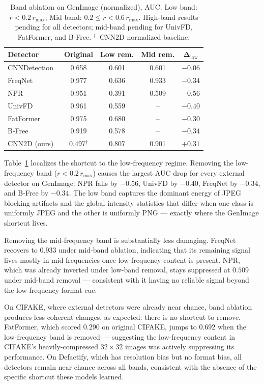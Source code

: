 \begin{table}[t]
\centering
\small
\setlength{\tabcolsep}{5pt}
\begin{tabular}{lcccc}
\toprule
\textbf{Detector} & \textbf{Original} & \textbf{Low rem.} & \textbf{Mid rem.} & $\boldsymbol{\Delta}_\text{low}$ \\
\midrule
CNNDetection~\cite{wang2020cnn} & 0.658 & 0.601 & 0.601 & $-0.06$ \\
FreqNet~\cite{freqnet}          & 0.977 & 0.636 & 0.933 & $-0.34$ \\
NPR~\cite{npr}                  & 0.951 & 0.391 & 0.509 & $-0.56$ \\
UnivFD~\cite{univfd}            & 0.961 & 0.559 & --    & $-0.40$ \\
FatFormer~\cite{fatformer}      & 0.975 & 0.680 & --    & $-0.30$ \\
B-Free~\cite{bfree}             & 0.919 & 0.578 & --    & $-0.34$ \\
CNN2D (ours)                    & 0.497$^\dag$ & 0.807 & 0.901 & $+0.31$ \\
\bottomrule
\end{tabular}
\caption{Band ablation on GenImage (normalized), AUC. Low band: $r < 0.2\,r_{\max}$; Mid band: $0.2\leq r < 0.6\,r_{\max}$. High-band results pending for all detectors; mid-band pending for UnivFD, FatFormer, and B-Free. $^\dag$~CNN2D normalized baseline.}
\label{tab:ablation}
\end{table}

Table~\ref{tab:ablation} localizes the shortcut to the low-frequency regime.
Removing the low-frequency band ($r < 0.2\,r_{\max}$) causes the largest AUC drop for every external detector on GenImage: NPR falls by $-0.56$, UnivFD by $-0.40$, FreqNet by $-0.34$, and B-Free by $-0.34$.
The low band captures the dominant energy of JPEG blocking artifacts and the global intensity statistics that differ when one class is uniformly JPEG and the other is uniformly PNG --- exactly where the GenImage shortcut lives.

Removing the mid-frequency band is substantially less damaging.
FreqNet recovers to $0.933$ under mid-band ablation, indicating that its remaining signal lives mostly in mid frequencies once low-frequency content is present.
NPR, which was already inverted under low-band removal, stays suppressed at $0.509$ under mid-band removal --- consistent with it having no reliable signal beyond the low-frequency format cue.

On CIFAKE, where external detectors were already near chance, band ablation produces less coherent changes, as expected: there is no shortcut to remove.
FatFormer, which scored $0.290$ on original CIFAKE, jumps to $0.692$ when the low-frequency band is removed --- suggesting the low-frequency content in CIFAKE's heavily-compressed $32\times32$ images was actively suppressing its performance.
On Defactify, which has resolution bias but no format bias, all detectors remain near chance across all bands, consistent with the absence of the specific shortcut these models learned.
